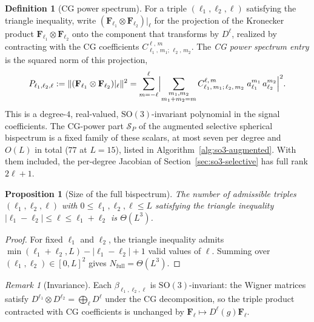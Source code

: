 \documentclass{article}
\newtheorem{proposition}[theorem]{Proposition}
\theoremstyle{definition}
\newtheorem{definition}[theorem]{Definition}
\theoremstyle{remark}
\newtheorem{remark}[theorem]{Remark}
\newcommand{\SO}{\mathrm{SO}}
\newcommand{\CG}[6]{C^{#5,\,#6}_{#1,\,#2;\,#3,\,#4}}
\theoremstyle{definition}
\begin{document}
\begin{definition}[CG power spectrum]\label{def:app-cg-power}
For a triple $(\ell_1, \ell_2, \ell)$ satisfying the triangle
inequality, write
$(\mathbf{F}_{\ell_1} \otimes \mathbf{F}_{\ell_2})\big|_\ell$
for the projection of the Kronecker product
$\mathbf{F}_{\ell_1} \otimes \mathbf{F}_{\ell_2}$ onto the
component that transforms by $D^\ell$, realized by contracting with the CG
coefficients $\CG{\ell_1}{m_1}{\ell_2}{m_2}{\ell}{m}$. The
\emph{CG power spectrum entry} is the squared norm of this projection,
\begin{equation}\label{eq:app-cg-power}
  P_{\ell_1,\ell_2,\ell}
  := \lVert (\mathbf{F}_{\ell_1} \otimes \mathbf{F}_{\ell_2})|_\ell
     \rVert^2
  = \sum_{m=-\ell}^{\ell}
    \Bigl\lvert \sum_{\substack{m_1,m_2 \\ m_1+m_2=m}}
      \CG{\ell_1}{m_1}{\ell_2}{m_2}{\ell}{m}\;
      a_{\ell_1}^{m_1}\, a_{\ell_2}^{m_2} \Bigr\rvert^2.
\end{equation}
This is a degree-$4$, real-valued, $\SO(3)$-invariant polynomial in
the signal coefficients. The CG-power part $\mathcal{S}_P$ of the
augmented selective spherical bispectrum is a fixed family of these scalars, at
most seven per degree and $O(L)$ in total ($77$ at $L=15$), listed in
Algorithm~\ref{alg:so3-augmented}. With them included, the per-degree Jacobian of
Section~\ref{sec:so3-selective} has full rank $2\ell{+}1$.
\end{definition}

\begin{proposition}[Size of the full bispectrum]\label{prop:app-full-size}
The number of admissible triples $(\ell_1, \ell_2, \ell)$ with
$0 \le \ell_1, \ell_2, \ell \le L$ satisfying the triangle inequality
$|\ell_1 - \ell_2| \le \ell \le \ell_1 + \ell_2$ is $\Theta(L^3)$.
\end{proposition}
\begin{proof}
For fixed $\ell_1$ and $\ell_2$, the triangle inequality admits
$\min(\ell_1 + \ell_2, L) - |\ell_1 - \ell_2| + 1$ valid values of
$\ell$. Summing over $(\ell_1,\ell_2)\in[0,L]^2$ gives
$N_{\mathrm{full}} = \Theta(L^3)$.
\end{proof}

\begin{remark}[Invariance]
Each $\beta_{\ell_1,\ell_2,\ell}$ is $\SO(3)$-invariant: the Wigner
matrices satisfy $D^{\ell_1} \otimes D^{\ell_2}
= \bigoplus_\ell D^\ell$ under the CG decomposition, so the triple
product contracted with CG coefficients is unchanged by
$\mathbf{F}_\ell \mapsto D^\ell(g)\mathbf{F}_\ell$.
\end{remark}
\end{document}
